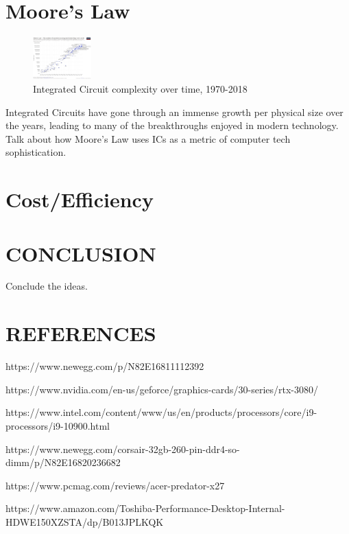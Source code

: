 \documentclass[letterpaper, 10 pt, conference]{IEEEconf}
\begin{document}
\section{Moore's Law}


\begin{figure}[h!]
\centering
\captionsetup{justification=centering}
\includegraphics[width=0.2\textwidth]{1024px-Moore's_Law_Transistor_Count_1971-2018.png}
\caption{Integrated Circuit complexity over time, 1970-2018}
\label{fig:example}
\end{figure} 
Integrated Circuits have gone through an immense growth per physical size over the years, leading to many of the breakthroughs enjoyed in modern technology. Talk about how Moore's Law uses ICs as a metric of computer tech sophistication.


\section{Cost/Efficiency}



\section{CONCLUSION}

Conclude the ideas.

\section*{REFERENCES}


\begin{enumerate}[label={[\arabic*]}]
\item https://www.newegg.com/p/N82E16811112392
\item https://www.nvidia.com/en-us/geforce/graphics-cards/30-series/rtx-3080/
\item https://www.intel.com/content/www/us/en/products/processors/core/i9-processors/i9-10900.html
\item https://www.newegg.com/corsair-32gb-260-pin-ddr4-so-dimm/p/N82E16820236682
\item https://www.pcmag.com/reviews/acer-predator-x27
\item https://www.amazon.com/Toshiba-Performance-Desktop-Internal-HDWE150XZSTA/dp/B013JPLKQK
\end{enumerate}
\end{document}
